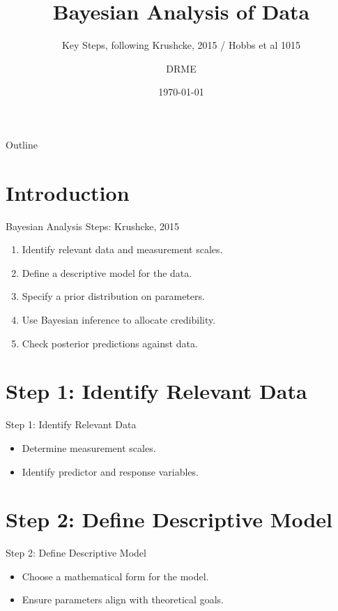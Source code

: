 \documentclass{beamer}
\begin{document}
\title{Bayesian Analysis of Data}
\subtitle{Key Steps, following Krushcke, 2015  / Hobbs et al 1015}
\author{DRME}
\date{\today}

\begin{frame}
  \titlepage
\end{frame}

\begin{frame}{Outline}
  \tableofcontents
\end{frame}

\section{Introduction}

\begin{frame}{Bayesian Analysis Steps: Krushcke, 2015}
  \begin{enumerate}
    \item Identify relevant data and measurement scales.
    \item Define a descriptive model for the data.
    \item Specify a prior distribution on parameters.
    \item Use Bayesian inference to allocate credibility.
    \item Check posterior predictions against data.
  \end{enumerate}
\end{frame}

\section{Step 1: Identify Relevant Data}

\begin{frame}{Step 1: Identify Relevant Data}
  \begin{itemize}
    \item Determine measurement scales.
    \item Identify predictor and response variables.
  \end{itemize}
\end{frame}

\section{Step 2: Define Descriptive Model}

\begin{frame}{Step 2: Define Descriptive Model}
  \begin{itemize}
    \item Choose a mathematical form for the model.
    \item Ensure parameters align with theoretical goals.
  \end{itemize}
\end{frame}
\end{document}
